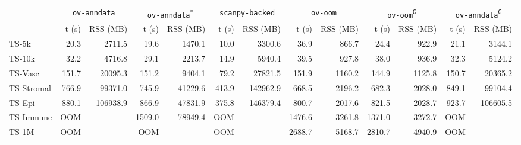 \begin{tabular}{lrrrrrrrrrrrr}
\toprule
 & \multicolumn{2}{c}{\texttt{ov-anndata}} & \multicolumn{2}{c}{\texttt{ov-anndata\textsuperscript{*}}} & \multicolumn{2}{c}{\texttt{scanpy-backed}} & \multicolumn{2}{c}{\texttt{ov-oom}} & \multicolumn{2}{c}{\texttt{ov-oom\textsuperscript{G}}} & \multicolumn{2}{c}{\texttt{ov-anndata\textsuperscript{G}}} \\
 & t (s) & RSS (MB) & t (s) & RSS (MB) & t (s) & RSS (MB) & t (s) & RSS (MB) & t (s) & RSS (MB) & t (s) & RSS (MB) \\
\midrule
TS-5k & 20.3 & 2711.5 & 19.6 & 1470.1 & 10.0 & 3300.6 & 36.9 & 866.7 & 24.4 & 922.9 & 21.1 & 3144.1 \\
TS-10k & 32.2 & 4716.8 & 29.1 & 2213.7 & 14.9 & 5940.4 & 39.5 & 927.8 & 38.0 & 936.9 & 32.3 & 5124.2 \\
TS-Vasc & 151.7 & 20095.3 & 151.2 & 9404.1 & 79.2 & 27821.5 & 151.9 & 1160.2 & 144.9 & 1125.8 & 150.7 & 20365.2 \\
TS-Stromal & 766.9 & 99371.0 & 745.9 & 41229.6 & 413.9 & 142962.9 & 668.5 & 2196.2 & 682.3 & 2028.0 & 849.1 & 99104.4 \\
TS-Epi & 880.1 & 106938.9 & 866.9 & 47831.9 & 375.8 & 146379.4 & 800.7 & 2017.6 & 821.5 & 2028.7 & 923.7 & 106605.5 \\
TS-Immune & OOM & -- & 1509.0 & 78949.4 & OOM & -- & 1476.6 & 3261.8 & 1371.0 & 3272.7 & OOM & -- \\
TS-1M & OOM & -- & OOM & -- & OOM & -- & 2688.7 & 5168.7 & 2810.7 & 4940.9 & OOM & -- \\
\bottomrule
\end{tabular}